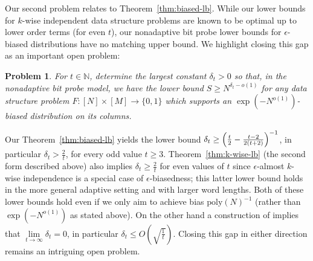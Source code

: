 \documentclass[11pt]{article}
\newtheorem{problem}{Problem}
\newcommand{\B}{\{0,1\}}
\newcommand{\poly}{\mathrm{poly}}
\begin{document}
Our second problem relates to Theorem~\ref{thm:biased-lb}. While our lower bounds for $k$-wise independent data structure problems are known to be optimal up to lower order terms (for even $t$), our nonadaptive bit probe lower bounds for $\epsilon$-biased distributions have no matching upper bound. We highlight closing this gap as an important open problem:
\begin{problem}\label{prob:eps}
For $t \in \mathbb{N}$, determine the largest constant $\delta_t >0$ so that, in the nonadaptive bit probe model, we have the lower bound $S \geq N^{\delta_t-o(1)}$ for any data structure problem $F:[N] \times [M] \to \B$ which supports an $\exp(-N^{o(1)})$-biased distribution on its columns.
\end{problem}
Our Theorem~\ref{thm:biased-lb} yields the lower bound $\delta_t\geq \Bigl( \frac{t}{2} - \frac{t-2}{2(t+2)}\Bigr)^{-1}$, in particular $\delta_t > \frac{2}{t}$, for every odd value $t \geq 3$. Theorem~\ref{thm:k-wise-lb} (the second form described above) also implies $\delta_t \geq \frac{2}{t}$ for even values of $t$ since $\epsilon$-almost $k$-wise independence is a special case of $\epsilon$-biasedness; this latter lower bound holds in the more general adaptive setting and with larger word lengths. Both of these lower bounds hold even if we only aim to achieve bias $\poly(N)^{-1}$ (rather than $\exp(-N^{o(1)})$ as stated above). On the other hand a construction of \cite{mossel-epsilon} implies that $\lim\limits_{t \to \infty} \delta_t = 0$, in particular $\delta_t \leq O(\sqrt{\frac{1}{t}} )$. Closing this gap in either direction remains an intriguing open problem.
\end{document}
